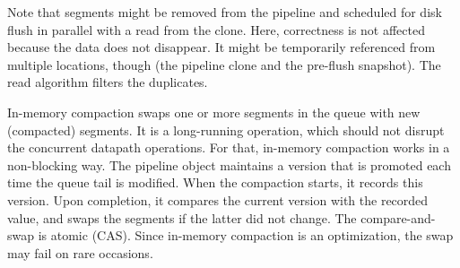 Note that segments might be removed from the pipeline and scheduled for disk flush in parallel with a read from the clone. 
Here, correctness is not affected because the data does not disappear. It might be temporarily referenced from multiple 
locations, though (the pipeline clone and the pre-flush snapshot). The read algorithm filters the duplicates. 

In-memory compaction swaps one or more segments in the queue with new (compacted) segments. It is a long-running operation, 
which should not disrupt the concurrent datapath operations. For that, in-memory compaction works in a non-blocking way. 
The pipeline object maintains a version that is promoted each time the queue tail is modified. When the compaction starts, 
it records this version. Upon completion, it compares the current version with the recorded value, and swaps 
the segments if the latter did not change. The compare-and-swap is atomic (CAS). Since in-memory compaction 
is an optimization, the swap may fail on rare occasions.  

